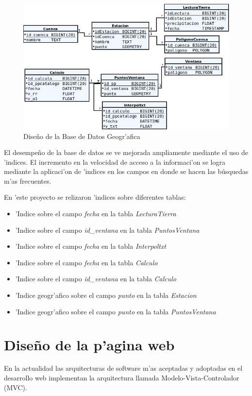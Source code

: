 \begin{figure}[h!]
 \centering
 \includegraphics[width=150mm]{./imagenes/DataBase.jpg}
 \caption{Dise\~no de la Base de Datos Geogr'afica}
\end{figure}

El desempe\~no de la base de datos se ve mejorada ampliamente mediante el uso de 'indices. El incremento en la
velocidad de acceso a la informaci'on se logra mediante la aplicaci'on de 'indices en los campos en donde
se hacen las búsquedas m'as frecuentes.

En 'este proyecto se relizaron 'indices sobre diferentes tablas:
\begin{itemize}
 \item 'Indice sobre el campo \textit{fecha} en la tabla \textit{LecturaTierra}
  \item 'Indice sobre el campo \textit{id\_ventana} en la tabla \textit{PuntosVentana}
  \item 'Indice sobre el campo \textit{fecha} en la tabla \textit{Interpoltxt}
  \item 'Indice sobre el campo \textit{fecha} en la tabla \textit{Calculo}
  \item 'Indice sobre el campo \textit{id\_ventana} en la tabla \textit{Calculo}
  \item 'Indice geogr'afico sobre el campo \textit{punto} en la tabla \textit{Estacion}
  \item 'Indice geogr'afico sobre el campo \textit{punto} en la tabla \textit{PuntosVentana}
\end{itemize}



\section{Dise\~no de la p'agina web}
En la actualidad las arquitecturas de software m'as aceptadas y adoptadas en 
el desarrollo web implementan la arquitectura llamada Modelo-Vista-Controlador (MVC).

